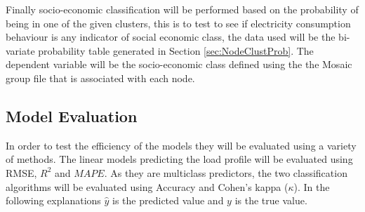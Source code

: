 Finally socio-economic classification will be performed based on the probability of being in one of the given clusters, this is to test to see if electricity consumption behaviour is any indicator of social economic class, the data used will be the bi-variate probability table generated in Section \ref{sec:NodeClustProb}. The dependent variable will be the socio-economic class defined using the the Mosaic group file that is associated with each node. 


\subsection{Model Evaluation}
In order to test the efficiency of the models they will be evaluated using a variety of methods. The linear models predicting the load profile will be evaluated using RMSE, $R^2$ and $MAPE$. As they are multiclass predictors, the two classification algorithms will be evaluated using Accuracy and Cohen's kappa ($\kappa$). In the following explanations $\hat{y}$ is the predicted value and $y$ is the true value.

